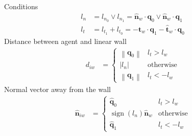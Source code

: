 Conditions
\begin{align}
l_{n} &= l_ {n_0} \vee l_{n_1} = \hat{\mathbf{n}}_{w} \cdot \mathbf{q}_{0} \vee \hat{\mathbf{n}}_{w} \cdot \mathbf{q}_{1} \\
l_{t} &= l_{t_1} + l_{t_0} = - \hat{\mathbf{t}}_{w} \cdot \mathbf{q}_{1} - \hat{\mathbf{t}}_{w} \cdot \mathbf{q}_{0}
\end{align}
Distance between agent and linear wall
\begin{align}
d_{iw} &=
\begin{cases}
\left\|\mathbf{q}_{0}\right\| & l_{t} > l_{w} \\
\left|l_{n}\right| & \text{otherwise} \\
\left\|\mathbf{q}_{1}\right\| & l_{t} < -l_{w}
\end{cases}
\end{align}
Normal vector away from the wall
\begin{align}
\hat{\mathbf{n}}_{iw} &=
\begin{cases}
\hat{\mathbf{q}}_{0} & l_{t} > l_{w} \\
\operatorname{sign}(l_{n})\hat{\mathbf{n}}_{w} & \text{otherwise} \\
\hat{\mathbf{q}}_{1} & l_{t} < -l_{w}
\end{cases}
\end{align}